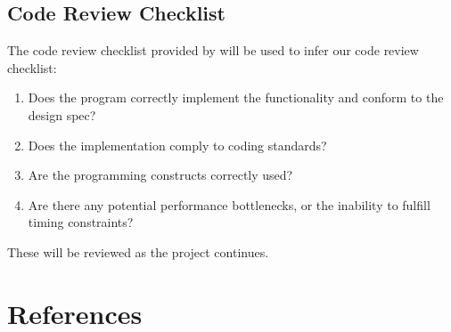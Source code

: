 \documentclass[11pt]{article}
\begin{document}
\subsection{Code Review Checklist}

The code review checklist provided by \cite{Book:1} will be used to infer our code review checklist: 

\begin{enumerate}
	\item Does the program correctly implement the functionality and conform to the design spec?
	\item Does the implementation comply to coding standards?
	\item Are the programming constructs correctly used?
	\item Are there any potential performance bottlenecks, or the inability to fulfill timing constraints?
\end{enumerate}

These will be reviewed as the project continues.

\section{References}


\end{document}

